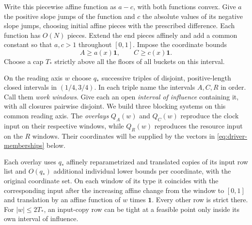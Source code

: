 Write this piecewise affine function as \(a-c\), with both functions
convex. Give \(a\) the positive slope jumps of the function and \(c\)
the absolute values of its negative slope jumps, choosing initial
affine pieces with the prescribed difference. Each function has
\(O(N)\) pieces. Extend the end pieces affinely and add a common constant
so that \(a,c>1\) throughout \([0,1]\). Impose the coordinate bounds
\begin{equation}\label{eq:driver-floors}
                    A\ge a(x)\mathbf1,\qquad C\ge c(x)\mathbf1 .
\end{equation}
Choose a cap \(T_*\) strictly above all the floors of all buckets on
this interval.

On the reading axis \(w\) choose \(q_*\) successive triples of
disjoint, positive-length closed intervals in \((1/4,3/4)\). In each
triple name the intervals \(A,C,R\) in order. Call them \emph{work
windows}. Give each an open \emph{interval of influence} containing
it, with all closures pairwise disjoint. We build three blocking
systems on this common reading axis. The \emph{overlays} \(Q_A(w)\)
and \(Q_C(w)\) reproduce the clock input on their respective windows,
while \(Q_R(w)\) reproduces the resource input on the \(R\) windows.
Their coordinates will be supplied by the vectors in
\eqref{eq:driver-memberships} below.

\begin{lemma}\label{lem:overlay}
Each overlay uses $q_*$ affinely reparametrized and translated copies of
its input row list and $O(q_*)$ additional individual lower bounds per
coordinate, with the original coordinate set. On each window of its type
it coincides with the corresponding input after the increasing affine
change from the window to $[0,1]$ and translation by an affine function
of $w$ times $\mathbf1$. Every other row is strict there. For
$|w|\le 2T_*$, an input-copy row can be tight at a feasible point only
inside its own interval of influence.
\end{lemma}

